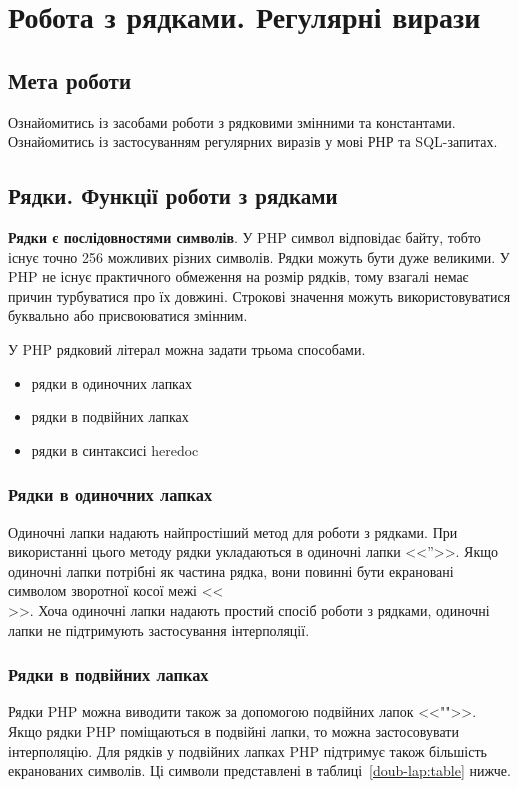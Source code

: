 \chapter{Робота з рядками. Регулярні вирази}
\section*{Мета роботи}
Ознайомитись із засобами роботи з рядковими змінними та константами. Ознайомитись із застосуванням регулярних виразів у мові РНР та SQL-запитах.
\nopagebreak[4]
\section{Рядки. Функції роботи з рядками}
\nopagebreak[4]
\textbf{Рядки є послідовностями символів}. У PHP символ відповідає байту, тобто існує точно 256 можливих різних символів. Рядки можуть бути дуже великими. У PHP не існує практичного обмеження на розмір рядків, тому взагалі немає причин турбуватися про їх довжині. Строкові значення можуть використовуватися буквально або присвоюватися змінним.

У PHP рядковий літерал можна задати трьома способами.
\begin{itemize}
\item рядки в одиночних лапках
\item рядки в подвійних лапках
\item рядки в синтаксисі heredoc 
\end{itemize}

\subsection*{Рядки в одиночних лапках}
Одиночні лапки надають найпростіший метод для роботи з рядками. При використанні цього методу рядки укладаються в одиночні лапки <<''>>. Якщо одиночні лапки потрібні як частина рядка, вони повинні бути екрановані символом зворотної косої межі <<\\>>. Хоча одиночні лапки надають простий спосіб роботи з рядками, одиночні лапки не підтримують застосування інтерполяції.
\subsection*{Рядки в подвійних лапках}
Рядки PHP можна виводити також за допомогою подвійних лапок <<"">>. Якщо рядки PHP поміщаються в подвійні лапки, то можна застосовувати інтерполяцію. Для рядків у подвійних лапках PHP підтримує також більшість екранованих символів. Ці символи представлені в таблиці~\ref{doub-lap:table} нижче.

